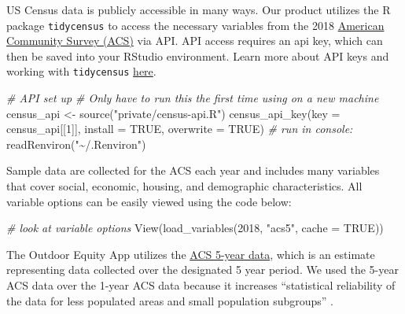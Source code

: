 \documentclass[
  11 pt,
  openany]{book}
\newenvironment{Shaded}{\begin{snugshade}}{\end{snugshade}}
\newcommand{\AttributeTok}[1]{\textcolor[rgb]{0.77,0.63,0.00}{#1}}
\newcommand{\CommentTok}[1]{\textcolor[rgb]{0.56,0.35,0.01}{\textit{#1}}}
\newcommand{\ConstantTok}[1]{\textcolor[rgb]{0.00,0.00,0.00}{#1}}
\newcommand{\DecValTok}[1]{\textcolor[rgb]{0.00,0.00,0.81}{#1}}
\newcommand{\FunctionTok}[1]{\textcolor[rgb]{0.00,0.00,0.00}{#1}}
\newcommand{\NormalTok}[1]{#1}
\newcommand{\OtherTok}[1]{\textcolor[rgb]{0.56,0.35,0.01}{#1}}
\newcommand{\StringTok}[1]{\textcolor[rgb]{0.31,0.60,0.02}{#1}}
\begin{document}
US Census data is publicly accessible in many ways. Our product utilizes the R package \texttt{tidycensus} \citep{R-tidycensus} to access the necessary variables from the 2018 \href{https://www.census.gov/programs-surveys/acs/data.html}{American Community Survey (ACS)} via API. API access requires an api key, which can then be saved into your RStudio environment. Learn more about API keys and working with \texttt{tidycensus} \href{https://walker-data.com/tidycensus/articles/basic-usage.html}{here}.

\begin{Shaded}
\begin{Highlighting}[]
\CommentTok{\# API set up}
\CommentTok{\# Only have to run this the first time using on a new machine}
\NormalTok{census\_api }\OtherTok{\textless{}{-}} \FunctionTok{source}\NormalTok{(}\StringTok{"private/census{-}api.R"}\NormalTok{)}
\FunctionTok{census\_api\_key}\NormalTok{(}\AttributeTok{key =}\NormalTok{ census\_api[[}\DecValTok{1}\NormalTok{]], }\AttributeTok{install =} \ConstantTok{TRUE}\NormalTok{, }\AttributeTok{overwrite =} \ConstantTok{TRUE}\NormalTok{)}
\CommentTok{\# run in console:}
\FunctionTok{readRenviron}\NormalTok{(}\StringTok{"\textasciitilde{}/.Renviron"}\NormalTok{)}
\end{Highlighting}
\end{Shaded}

Sample data are collected for the ACS each year and includes many variables that cover social, economic, housing, and demographic characteristics. All variable options can be easily viewed using the code below:

\begin{Shaded}
\begin{Highlighting}[]
\CommentTok{\# look at variable options}
\FunctionTok{View}\NormalTok{(}\FunctionTok{load\_variables}\NormalTok{(}\DecValTok{2018}\NormalTok{, }\StringTok{"acs5"}\NormalTok{, }\AttributeTok{cache =} \ConstantTok{TRUE}\NormalTok{))}
\end{Highlighting}
\end{Shaded}

The Outdoor Equity App utilizes the \href{https://www.census.gov/data/developers/data-sets/acs-5year.html}{ACS 5-year data}, which is an estimate representing data collected over the designated 5 year period. We used the 5-year ACS data over the 1-year ACS data because it increases ``statistical reliability of the data for less populated areas and small population subgroups'' \citep{ACS}.
\end{document}
